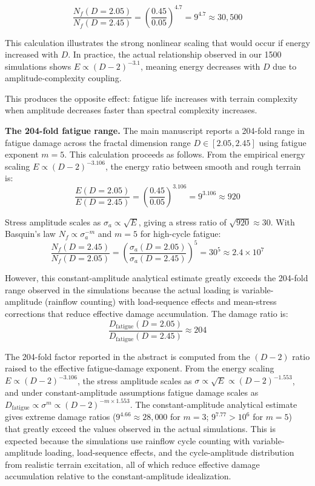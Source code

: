 \documentclass[11pt]{article}
\begin{document}
\begin{equation}
\frac{N_f(D=2.05)}{N_f(D=2.45)} = \left(\frac{0.45}{0.05}\right)^{4.7} = 9^{4.7} \approx 30{,}500
\end{equation}

This calculation illustrates the strong nonlinear scaling that would occur if energy increased with $D$. In practice, the actual relationship observed in our 1500 simulations shows $E \propto (D-2)^{-3.1}$, meaning energy decreases with $D$ due to amplitude-complexity coupling. 

This produces the opposite effect: fatigue life increases with terrain complexity when amplitude decreases faster than spectral complexity increases.

\textbf{The 204-fold fatigue range.} The main manuscript reports a 204-fold range in fatigue damage across the fractal dimension range $D \in [2.05, 2.45]$ using fatigue exponent $m = 5$. This calculation proceeds as follows. From the empirical energy scaling $E \propto (D-2)^{-3.106}$, the energy ratio between smooth and rough terrain is:
\begin{equation}
\frac{E(D=2.05)}{E(D=2.45)} = \left(\frac{0.45}{0.05}\right)^{3.106} = 9^{3.106} \approx 920
\end{equation}

Stress amplitude scales as $\sigma_a \propto \sqrt{E}$, giving a stress ratio of $\sqrt{920} \approx 30$. With Basquin's law $N_f \propto \sigma_a^{-m}$ and $m = 5$ for high-cycle fatigue:
\begin{equation}
\frac{N_f(D=2.45)}{N_f(D=2.05)} = \left(\frac{\sigma_a(D=2.05)}{\sigma_a(D=2.45)}\right)^5 = 30^5 \approx 2.4 \times 10^7
\end{equation}

However, this constant-amplitude analytical estimate greatly exceeds the 204-fold range observed in the simulations because the actual loading is variable-amplitude (rainflow counting) with load-sequence effects and mean-stress corrections that reduce effective damage accumulation. The damage ratio is:
\begin{equation}
\frac{D_{\text{fatigue}}(D=2.05)}{D_{\text{fatigue}}(D=2.45)} \approx 204
\end{equation}

The 204-fold factor reported in the abstract is computed from the $(D-2)$ ratio raised to the effective fatigue-damage exponent. From the energy scaling $E \propto (D-2)^{-3.106}$, the stress amplitude scales as $\sigma \propto \sqrt{E} \propto (D-2)^{-1.553}$, and under constant-amplitude assumptions fatigue damage scales as $D_{\text{fatigue}} \propto \sigma^m \propto (D-2)^{-m \times 1.553}$. The constant-amplitude analytical estimate gives extreme damage ratios ($9^{4.66} \approx 28{,}000$ for $m = 3$; $9^{7.77} > 10^6$ for $m = 5$) that greatly exceed the values observed in the actual simulations. This is expected because the simulations use rainflow cycle counting with variable-amplitude loading, load-sequence effects, and the cycle-amplitude distribution from realistic terrain excitation, all of which reduce effective damage accumulation relative to the constant-amplitude idealization.
\end{document}
